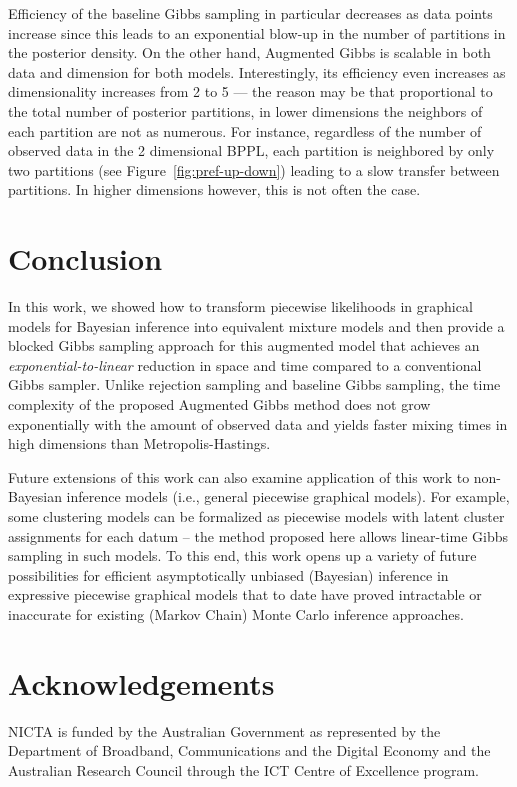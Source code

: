 \documentclass[letterpaper]{article}
\begin{document}
Efficiency of the baseline Gibbs sampling in particular decreases as data points increase since
this leads to an exponential blow-up in the number of partitions in the posterior density.
On the other hand, Augmented Gibbs is scalable in both data 
and dimension for both models. 
Interestingly, its efficiency even increases as dimensionality increases from 2 to 5 ---
the reason may be that proportional to the total number of posterior partitions, in lower dimensions the neighbors of each partition are not as numerous. 
For instance, regardless of the number of observed data in the 2 dimensional BPPL, each partition is neighbored by only two partitions (see Figure~\ref{fig:pref-up-down}) leading to a slow transfer between partitions. 
In higher dimensions however, this is not often the case.


\section{Conclusion}
\label{sect:conclusion}
In this work, we showed how to transform piecewise likelihoods in
graphical models for Bayesian inference into equivalent mixture models
and then provide a blocked Gibbs sampling approach for this augmented
model that achieves an \emph{exponential-to-linear} reduction in space
and time compared to a conventional Gibbs sampler.  Unlike rejection
sampling and baseline Gibbs sampling, the time complexity of the
proposed Augmented Gibbs method does not grow exponentially with the
amount of observed data and yields faster mixing times in high
dimensions than Metropolis-Hastings.

Future extensions of this work can also examine application of this
work to non-Bayesian inference models (i.e., general piecewise
graphical models).  For example, some clustering models can be
formalized as piecewise models with latent cluster assignments for
each datum -- the method proposed here allows linear-time Gibbs
sampling in such models.  To this end, this work opens up a variety of
future possibilities for efficient asymptotically unbiased (Bayesian)
inference in expressive piecewise graphical models that to date have
proved intractable or inaccurate for existing (Markov Chain) Monte
Carlo inference approaches.


{\footnotesize
\section*{Acknowledgements}
NICTA is funded by the Australian Government as represented by
the Department of Broadband, Communications and the Digital
Economy and the Australian Research Council through the ICT
Centre of Excellence program.}

\clearpage

\end{document}
